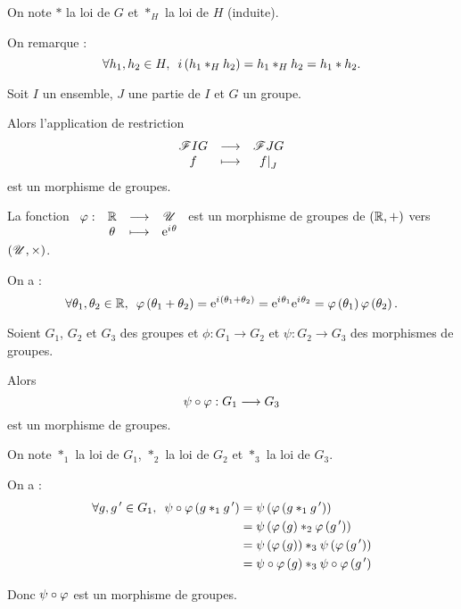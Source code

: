 \begin{dem}
On note \(*\) la loi de \(G\) et \(*_H\) la loi de \(H\) (induite).

On remarque : \[\quantifs{\forall h_1,h_2\in H}i\paren{h_1*_Hh_2}=h_1*_Hh_2=h_1*h_2.\]
\end{dem}

\begin{ex}
Soit \(I\) un ensemble, \(J\) une partie de \(I\) et \(G\) un groupe.

Alors l'application de restriction \[\fonctionlambda{\F{I}{G}}{\F{J}{G}}{f}{\restr{f}{J}}\] est un morphisme de groupes.
\end{ex}

\begin{ex}
La fonction \(\begin{array}[t]{cccc}\varphi : & \mathbb{R} & \longrightarrow & \mathscr{U} \\ & \theta & \longmapsto & \mathrm{e}^{i\mkern1mu\theta}\end{array}\) est un morphisme de groupes de \(\groupe{\R}\) vers \(\groupe{\U}[\times]\).
\end{ex}

\begin{dem}
On a : \[\quantifs{\forall\theta_1,\theta_2\in\R}\phi\paren{\theta_1+\theta_2}=\e{\i\paren{\theta_1+\theta_2}}=\e{\i\theta_1}\e{\i\theta_2}=\phi\paren{\theta_1}\phi\paren{\theta_2}.\]
\end{dem}

\begin{prop}
Soient \(G_1\), \(G_2\) et \(G_3\) des groupes et \(\phi:G_1\to G_2\) et \(\psi:G_2\to G_3\) des morphismes de groupes.

Alors \[\psi\circ\varphi:G_1\longrightarrow G_3\] est un morphisme de groupes.
\end{prop}

\begin{dem}
On note \(*_1\) la loi de \(G_1\), \(*_2\) la loi de \(G_2\) et \(*_3\) la loi de \(G_3\).

On a : \[\begin{aligned}
\quantifs{\forall g,g\prim\in G_1}\psi\rond\phi\paren{g*_1g\prim}&=\psi\paren{\phi\paren{g*_1g\prim}} \\
&=\psi\paren{\phi\paren{g}*_2\phi\paren{g\prim}} \\
&=\psi\paren{\phi\paren{g}}*_3\psi\paren{\phi\paren{g\prim}} \\
&=\psi\rond\phi\paren{g}*_3\psi\rond\phi\paren{g\prim}
\end{aligned}\]

Donc \(\psi\circ\varphi\) est un morphisme de groupes.
\end{dem}

